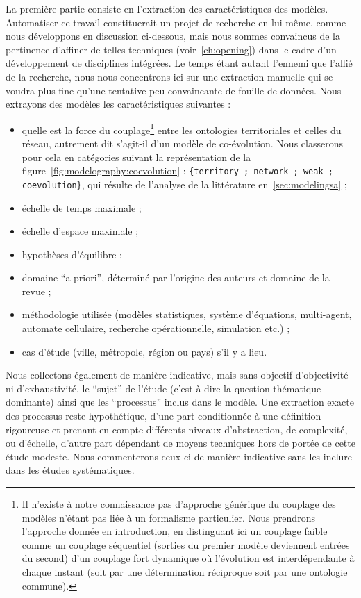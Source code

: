 La première partie consiste en l'extraction des caractéristiques des modèles. Automatiser ce travail constituerait un projet de recherche en lui-même, comme nous développons en discussion ci-dessous, mais nous sommes convaincus de la pertinence d'affiner de telles techniques (voir~\ref{ch:opening}) dans le cadre d'un développement de disciplines intégrées. Le temps étant autant l'ennemi que l'allié de la recherche, nous nous concentrons ici sur une extraction manuelle qui se voudra plus fine qu'une tentative peu convaincante de fouille de données. Nous extrayons des modèles les caractéristiques suivantes :

\begin{itemize}
\item quelle est la force du couplage\footnote{Il n'existe à notre connaissance pas d'approche générique du couplage des modèles n'étant pas liée à un formalisme particulier. Nous prendrons l'approche donnée en introduction, en distinguant ici un couplage faible comme un couplage séquentiel (sorties du premier modèle deviennent entrées du second) d'un couplage fort dynamique où l'évolution est interdépendante à chaque instant (soit par une détermination réciproque soit par une ontologie commune).} entre les ontologies territoriales et celles du réseau, autrement dit s'agit-il d'un modèle de co-évolution. Nous classerons pour cela en catégories suivant la représentation de la figure~\ref{fig:modelography:coevolution} : \texttt{\{territory ; network ; weak ; coevolution\}}, qui résulte de l'analyse de la littérature en~\ref{sec:modelingsa} ;
\item échelle de temps maximale ; %
\item échelle d'espace maximale ; %
\item hypothèses d'équilibre ;
\item domaine ``a priori'', déterminé par l'origine des auteurs et domaine de la revue ;
\item méthodologie utilisée (modèles statistiques, système d'équations, multi-agent, automate cellulaire, recherche opérationnelle, simulation etc.) ;
\item cas d'étude (ville, métropole, région ou pays) s'il y a lieu.
\end{itemize}

Nous collectons également de manière indicative, mais sans objectif d'objectivité ni d'exhaustivité, le ``sujet'' de l'étude (c'est à dire la question thématique dominante) ainsi que les ``processus'' inclus dans le modèle. Une extraction exacte des processus reste hypothétique, d'une part conditionnée à une définition rigoureuse et prenant en compte différents niveaux d'abstraction, de complexité, ou d'échelle, d'autre part dépendant de moyens techniques hors de portée de cette étude modeste. Nous commenterons ceux-ci de manière indicative sans les inclure dans les études systématiques.


